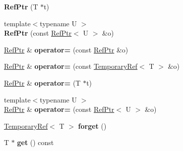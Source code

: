 \begin{DoxyCompactItemize}
\item 
\hypertarget{classmozilla_1_1_ref_ptr_a059916d64c199db20c05d579e1045e07}{{\bfseries Ref\-Ptr} (T $\ast$t)}\label{classmozilla_1_1_ref_ptr_a059916d64c199db20c05d579e1045e07}

\item 
\hypertarget{classmozilla_1_1_ref_ptr_af9f1c2a35a3f737bf9efa6b0acbe480c}{{\footnotesize template$<$typename U $>$ }\\{\bfseries Ref\-Ptr} (const \hyperlink{classmozilla_1_1_ref_ptr}{Ref\-Ptr}$<$ U $>$ \&o)}\label{classmozilla_1_1_ref_ptr_af9f1c2a35a3f737bf9efa6b0acbe480c}

\item 
\hypertarget{classmozilla_1_1_ref_ptr_a17510a76f2a10669b67add979ec8f029}{\hyperlink{classmozilla_1_1_ref_ptr}{Ref\-Ptr} \& {\bfseries operator=} (const \hyperlink{classmozilla_1_1_ref_ptr}{Ref\-Ptr} \&o)}\label{classmozilla_1_1_ref_ptr_a17510a76f2a10669b67add979ec8f029}

\item 
\hypertarget{classmozilla_1_1_ref_ptr_af0ea24480ea215c2c880752953bf406c}{\hyperlink{classmozilla_1_1_ref_ptr}{Ref\-Ptr} \& {\bfseries operator=} (const \hyperlink{classmozilla_1_1_temporary_ref}{Temporary\-Ref}$<$ T $>$ \&o)}\label{classmozilla_1_1_ref_ptr_af0ea24480ea215c2c880752953bf406c}

\item 
\hypertarget{classmozilla_1_1_ref_ptr_abd28b8e687bd0bacce4c07c6e5af517f}{\hyperlink{classmozilla_1_1_ref_ptr}{Ref\-Ptr} \& {\bfseries operator=} (T $\ast$t)}\label{classmozilla_1_1_ref_ptr_abd28b8e687bd0bacce4c07c6e5af517f}

\item 
\hypertarget{classmozilla_1_1_ref_ptr_a9aac21669a2e040834d4e69812b0d0bb}{{\footnotesize template$<$typename U $>$ }\\\hyperlink{classmozilla_1_1_ref_ptr}{Ref\-Ptr} \& {\bfseries operator=} (const \hyperlink{classmozilla_1_1_ref_ptr}{Ref\-Ptr}$<$ U $>$ \&o)}\label{classmozilla_1_1_ref_ptr_a9aac21669a2e040834d4e69812b0d0bb}

\item 
\hypertarget{classmozilla_1_1_ref_ptr_ada0259c09825f15879bc9a062d298d43}{\hyperlink{classmozilla_1_1_temporary_ref}{Temporary\-Ref}$<$ T $>$ {\bfseries forget} ()}\label{classmozilla_1_1_ref_ptr_ada0259c09825f15879bc9a062d298d43}

\item 
\hypertarget{classmozilla_1_1_ref_ptr_aabc2911118bb03e4ed92bed41f76b33f}{T $\ast$ {\bfseries get} () const }\label{classmozilla_1_1_ref_ptr_aabc2911118bb03e4ed92bed41f76b33f}


\end{DoxyCompactItemize}
